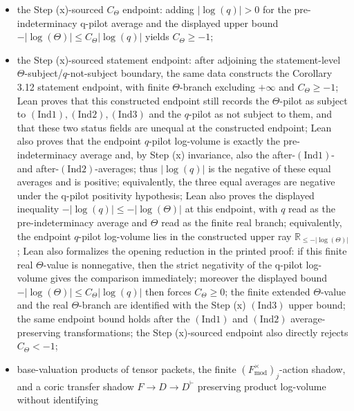 \documentclass[11pt]{article}
\begin{document}
\begin{itemize}
  the same data constructs the q-pilot two-computation record, with the input
  prime-strip reading equal to the pre-indeterminacy average and bounded by the
  \(\Theta\)-hull upper-ray value;
\item the Step (x)-sourced \(C_\Theta\) endpoint:
  adding \(|\log(q)|>0\) for the pre-indeterminacy q-pilot average and the
  displayed upper bound
  \(-|\log(\Theta)|\le C_\Theta|\log(q)|\) yields \(C_\Theta\ge-1\);
\item the Step (x)-sourced statement endpoint:
  after adjoining the statement-level
  \(\Theta\)-subject/\(q\)-not-subject boundary, the same data constructs the
  Corollary 3.12 statement endpoint, with finite \(\Theta\)-branch excluding
  \(+\infty\) and \(C_\Theta\ge-1\); Lean proves that this constructed endpoint still records
  the \(\Theta\)-pilot as subject to \((\mathrm{Ind1}),(\mathrm{Ind2}),
  (\mathrm{Ind3})\) and the \(q\)-pilot as not subject to them, and that these
  two status fields are unequal at the constructed endpoint; Lean also proves
  that the endpoint \(q\)-pilot log-volume is exactly the pre-indeterminacy
  average and, by Step (x) invariance, also the after-\((\mathrm{Ind1})\)- and
  after-\((\mathrm{Ind2})\)-averages; thus \(|\log(q)|\) is the negative of
  these equal averages and is positive; equivalently, the three equal averages
  are negative under the q-pilot positivity hypothesis; Lean also proves
  the displayed inequality
  \(-|\log(q)|\le-|\log(\Theta)|\) at this endpoint, with \(q\) read as the
  pre-indeterminacy average and \(\Theta\) read as the finite real branch;
  equivalently, the endpoint \(q\)-pilot log-volume lies in the constructed
  upper ray \(\mathbb{R}_{\le-|\log(\Theta)|}\);
  Lean also formalizes the opening reduction in the printed proof: if this
  finite real \(\Theta\)-value is nonnegative, then the strict negativity of the
  q-pilot log-volume gives the comparison immediately; moreover the displayed
  bound
  \(-|\log(\Theta)|\le C_\Theta|\log(q)|\) then forces \(C_\Theta\ge0\);
  the finite extended \(\Theta\)-value and the real \(\Theta\)-branch are
  identified with the Step (x) \((\mathrm{Ind3})\) upper bound; the same endpoint bound holds after the
  \((\mathrm{Ind1})\) and \((\mathrm{Ind2})\) average-preserving
  transformations; the Step (x)-sourced endpoint also directly rejects
  \(C_\Theta<-1\);
\item base-valuation products of tensor packets, the finite
  \((F_{\mathrm{mod}}^\times)_j\)-action shadow, and a coric transfer shadow
  \(F\to D\to D^\vdash\) preserving product log-volume without identifying

\end{itemize}
\end{document}
